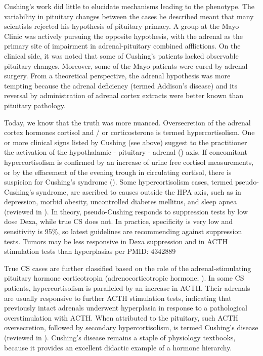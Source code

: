\documentclass[12pt,english]{report}\usepackage[]{graphicx}\usepackage[]{color}
\newenvironment{lyxgreyedout}
  {\textcolor{note_fontcolor}\bgroup\ignorespaces}
  {\ignorespacesafterend\egroup}
\begin{document}
Cushing's work did little to elucidate mechanisms leading to the phenotype.
The variability in pituitary changes between the cases he described
meant that many scientists rejected his hypothesis of pituitary primacy.
A group at the Mayo Clinic was actively pursuing the opposite hypothesis,
with the adrenal as the primary site of impairment in adrenal-pituitary
combined afflictions\citep{kepler1949cushings}. On the clinical side,
it was noted that some of Cushing's patients lacked observable pituitary
changes. Moreover, some of the Mayo patients were cured by adrenal
surgery. From a theoretical perspective, the adrenal hypothesis was
more tempting because the adrenal deficiency (termed Addison's disease)
and its reversal by administration of adrenal cortex extracts were
better known than pituitary pathology\citep{thorn1939treatment}.

Today, we know that the truth was more nuanced. Oversecretion of the
adrenal cortex hormones cortisol and / or corticosterone is termed
hypercortisolism. One or more clinical signs listed by Cushing (see
above) suggest to the practitioner the activation of the hypothalamic
- pituitary - adrenal ()
axis. If concomitant hypercortisolism is confirmed by an increase
of urine free cortisol measurements, or by the effacement of the evening
trough in circulating cortisol, there is suspicion for Cushing's syndrome
()\citep{nieman2008diagnosis}.
Some hypercortisolism cases, termed pseudo-Cushing's syndrome, are
ascribed to causes outside the HPA axis, such as in depression, morbid
obesity, uncontrolled diabetes mellitus, and sleep apnea (reviewed
in \citep{nieman2002diagnostic}).%
\begin{lyxgreyedout}
In theory, pseudo-Cushing responds to suppression tests by low dose
Dexa, while true CS does not. In practice, specificity is very low
and sensitivity is 95\%, so latest guidelines are recommending against
suppression tests. Tumors may be less responsive in Dexa suppression
and in ACTH stimulation tests than hyperplasias per PMID: 4342889%
\end{lyxgreyedout}


True CS cases are further classified based on the role of the adrenal-stimulating
pituitary hormone corticotropin (adrenocorticotropic hormone; ).
In some CS patients, hypercortisolism is paralleled by an increase
in ACTH. Their adrenals are usually responsive to further ACTH stimulation
tests, indicating that previously intact adrenals underwent hyperplasia
in response to a pathological overstimulation with ACTH. When attributed
to the pituitary, such ACTH oversecretion, followed by secondary hypercortisolism,
is termed Cushing's disease (reviewed in \citep{kirk2000cushings}).
Cushing's disease remains a staple of physiology textbooks, because
it provides an excellent didactic example of a hormone hierarchy.
\end{document}
